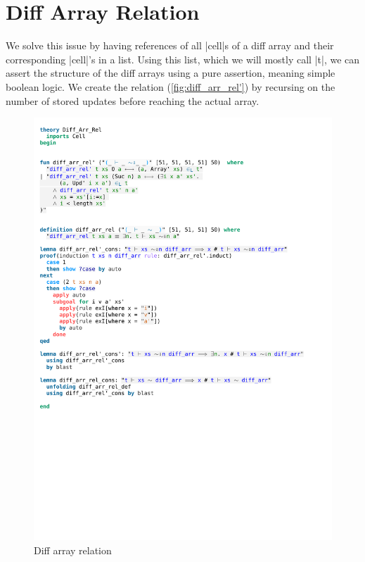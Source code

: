 \section{Diff Array Relation}

We solve this issue by having references of all |cell|s of a diff array and their corresponding |cell|'s in a list. Using this list, which we will mostly call |t|, we can assert the structure of the diff arrays using a pure assertion, meaning simple boolean logic. We create the relation (\autoref{fig:diff_arr_rel'}) by recursing on the number of stored updates before reaching the actual array.

\begin{figure}[htpb]
    \includegraphics[trim={0 22,4cm 0 2,9cm}, clip, width=1.00\textwidth]{figures/Theory_Diff_Arr_Rel.pdf}
    \caption[Diff array relation]{Diff array relation\footnotemark}
    \label{fig:diff_arr_rel'}
\end{figure}

